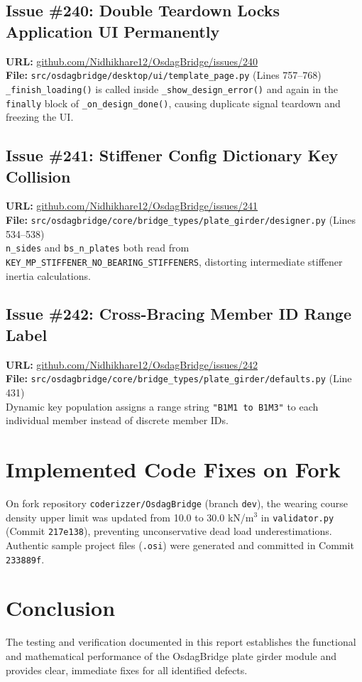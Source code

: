 \documentclass[10pt,a4paper]{article}
\begin{document}
\subsection{Issue \#240: Double Teardown Locks Application UI Permanently}
\textbf{URL:} \href{https://github.com/Nidhikhare12/OsdagBridge/issues/240}{github.com/Nidhikhare12/OsdagBridge/issues/240}\\
\textbf{File:} \texttt{src/osdagbridge/desktop/ui/template\_page.py} (Lines 757--768)\\
\texttt{\_finish\_loading()} is called inside \texttt{\_show\_design\_error()} and again in the \texttt{finally} block of \texttt{\_on\_design\_done()}, causing duplicate signal teardown and freezing the UI.

\subsection{Issue \#241: Stiffener Config Dictionary Key Collision}
\textbf{URL:} \href{https://github.com/Nidhikhare12/OsdagBridge/issues/241}{github.com/Nidhikhare12/OsdagBridge/issues/241}\\
\textbf{File:} \texttt{src/osdagbridge/core/bridge_types/plate\_girder/designer.py} (Lines 534--538)\\
\texttt{n\_sides} and \texttt{bs\_n\_plates} both read from \texttt{KEY\_MP\_STIFFENER\_NO\_BEARING\_STIFFENERS}, distorting intermediate stiffener inertia calculations.

\subsection{Issue \#242: Cross-Bracing Member ID Range Label}
\textbf{URL:} \href{https://github.com/Nidhikhare12/OsdagBridge/issues/242}{github.com/Nidhikhare12/OsdagBridge/issues/242}\\
\textbf{File:} \texttt{src/osdagbridge/core/bridge_types/plate\_girder/defaults.py} (Line 431)\\
Dynamic key population assigns a range string \texttt{"B1M1 to B1M3"} to each individual member instead of discrete member IDs.

\section{Implemented Code Fixes on Fork}
On fork repository \texttt{coderizzer/OsdagBridge} (branch \texttt{dev}), the wearing course density upper limit was updated from 10.0 to 30.0 kN/m$^3$ in \texttt{validator.py} (Commit \texttt{217e138}), preventing unconservative dead load underestimations. Authentic sample project files (\texttt{.osi}) were generated and committed in Commit \texttt{233889f}.

\section{Conclusion}
The testing and verification documented in this report establishes the functional and mathematical performance of the OsdagBridge plate girder module and provides clear, immediate fixes for all identified defects.
\end{document}
